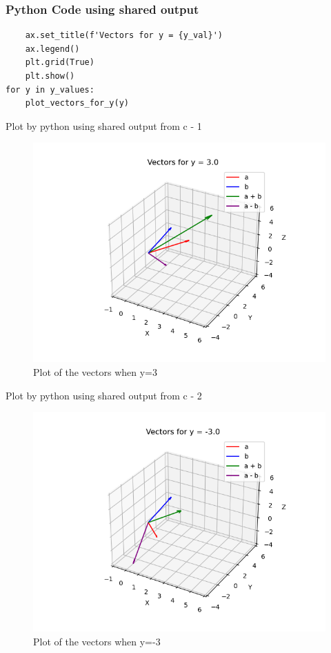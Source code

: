 \documentclass{beamer}
\begin{document}
\begin{frame}[fragile]
\frametitle{Python Code using shared output}
\begin{lstlisting}
    ax.set_title(f'Vectors for y = {y_val}')
    ax.legend()
    plt.grid(True)
    plt.show()
for y in y_values:
    plot_vectors_for_y(y)
\end{lstlisting}
    
\end{frame}
\begin{frame}{Plot by python using shared output from c - 1}
	\begin{center}
	\begin{figure}[H]
		\centering
		\includegraphics[width = 0.7\columnwidth]{figs/fig1.png}
		\caption{Plot of the vectors when y=3}
		\label{fig1}
	\end{figure}
	\end{center}
\end{frame}
\begin{frame}{Plot by python using shared output from c - 2}
\begin{figure}
    \centering
    \includegraphics[width=0.7\columnwidth]{figs/fig2.png}
    \caption{Plot of the vectors when y=-3}
    \label{fig2}
\end{figure}
    
\end{frame}
\end{document}
